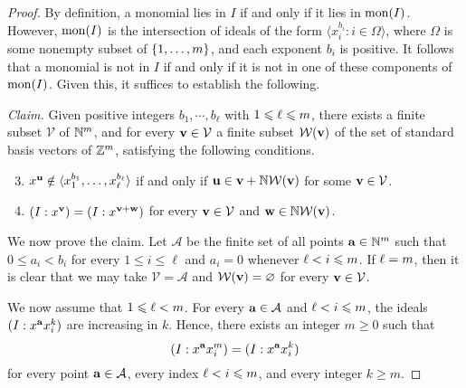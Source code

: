 \documentclass[11pt]{amsart}
\begin{document}
\begin{proof}  By definition, a monomial lies in $I$ if and only if it lies in $\operatorname{mon}(I)$.  However, $\operatorname{mon}(I)$ is the intersection of ideals of the form $\langle x_i^{b_i} : i \in \Omega \rangle$, where $\Omega$ is some nonempty subset of $\{ 1, \ldots, m \}$, and each exponent $b_i$ is positive.   It follows that a monomial is not in $I$ if and only if it is not in one of these components of $\operatorname{mon}(I)$.  Given this, it suffices to establish the following.

\vspace{.2cm}

\noindent \emph{Claim.} Given positive integers  $b_1, \cdots, b_{\ell}$ with $1 \leqslant \ell \leqslant m$, there exists a finite subset $\mathcal{V}$ of $\mathbb{N}^m$, and for every $\mathbf{v} \in \mathcal{V}$ a finite subset $\mathcal{W}(\mathbf{v})$ of the set of standard basis vectors of $\mathbb{Z}^m$,  satisfying the following conditions.
\begin{enumerate}
\setcounter{enumi}{2}
\item \label{stab-1: e} $x^{\mathbf{u}} \notin \langle x_1^{b_1}, \ldots, x_{\ell}^{b_{\ell}} \rangle $ if and only if $\mathbf{u} \in \mathbf{v} + \mathbb{N} \mathcal{W}(\mathbf{v})$ for some $\mathbf{v} \in \mathcal{V}$.
\item \label{stab-2: e} $(I:x^{\mathbf{v}}) = (I: x^{\mathbf{v}+\mathbf{w}})$ for every $\mathbf{v} \in \mathcal{V}$ and $\mathbf{w} \in  \mathbb{N}  \mathcal{W}(\mathbf{v})$.
\end{enumerate}

\vspace{.15cm}


We now prove the claim.  Let $\mathcal{A}$ be the finite set of all points $\mathbf{a} \in \mathbb{N}^m$ such that $0 \leq a_i < b_i$ for every $1 \leq i \leq \ell$ and $a_i = 0$ whenever $\ell < i \leqslant m$.  If $\ell = m$, then it is clear that we may take $\mathcal{V} = \mathcal{A}$ and $\mathcal{W}(\mathbf{v}) = \varnothing$ for every $\mathbf{v} \in \mathcal{V}$.

We now assume that $1 \leqslant \ell < m$.
For every $\mathbf{a} \in \mathcal{A}$ and $\ell < i \leqslant m$, the ideals $(I: x^{\mathbf{a}} x_i^k)$ are increasing in $k$.  Hence, there exists an integer $m \geq 0$ such that
\begin{equation}
\label{colon-simple: e}
(I: x^{\mathbf{a}}x_i^m) = (I: x^{\mathbf{a}}x_i^k)
\end{equation}
for every point $\mathbf{a} \in \mathcal{A}$, every index $\ell < i \leqslant m$, and every integer $k \geq m$.



\end{proof}
\end{document}
